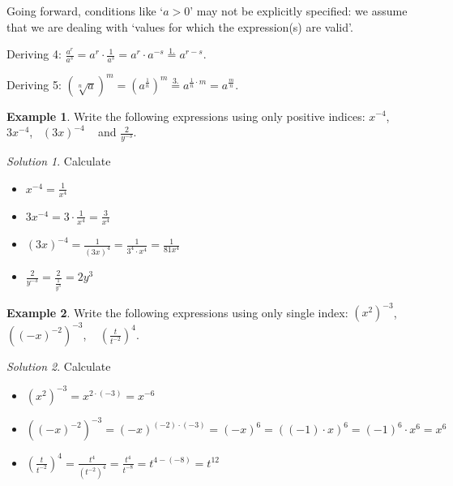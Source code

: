 \documentclass[
  english,
  12pt,
  oneside]{book}
\providecommand{\tightlist}{%
  \setlength{\itemsep}{0pt}\setlength{\parskip}{0pt}}
\theoremstyle{definition}
\theoremstyle{definition}
\newtheorem{example}{Example}[chapter]
\theoremstyle{definition}
\theoremstyle{definition}
\theoremstyle{remark}
\newtheorem*{solution}{Solution}
\begin{document}
Going forward, conditions like `\(a>0\)' may not be explicitly specified: we assume that we are dealing with `values for which the expression(s) are valid'.

Deriving 4: \(\frac{a^r}{a^s} = a^r\cdot \frac{1}{a^s} = a^r\cdot a^{-s} \stackrel{1.}{=} a^{r-s}\).

Deriving 5: \(\left(\sqrt[n]{a}\right)^m = \left(a^{\frac{1}{n}}\right)^m \stackrel{3.}{=} a^{\frac{1}{n}\cdot m} = a^\frac{m}{n}\).

\begin{example}
Write the following expressions using only positive indices: \(x^{-4}\),~ \(3x^{-4}\),~ \((3x)^{-4}\) ~ and \(\frac{2}{y^{-3}}\).
\end{example}

\begin{solution}

Calculate

\begin{itemize}
\tightlist
\item
  \(x^{-4}=\frac{1}{x^4}\)
\item
  \(3x^{-4}=3\cdot\frac{1}{x^4}=\frac{3}{x^4}\)
\item
  \((3x)^{-4} = \frac{1}{(3x)^4} = \frac{1}{3^4\cdot x^4}=\frac{1}{81x^4}\)
\item
  \(\frac{2}{y^{-3}}=\frac{2}{\frac{1}{y^3}}=2y^3\)
\end{itemize}

\end{solution}

\begin{example}
Write the following expressions using only single index: \(\left(x^2\right)^{-3}\), ~ \(\left((-x)^{-2}\right)^{-3}\), ~ \(\left(\frac{t}{t^{-2}}\right)^{4}\).
\end{example}

\begin{solution}

Calculate

\begin{itemize}
\tightlist
\item
  \(\left(x^2\right)^{-3} = x^{2\cdot(-3)}=x^{-6}\)
\item
  \(\left((-x)^{-2}\right)^{-3} = (-x)^{(-2)\cdot(-3)}=(-x)^{6}=\left((-1)\cdot x\right)^6=(-1)^6\cdot x^6=x^6\)
\item
  \(\left(\frac{t}{t^{-2}}\right)^{4}=\frac{t^4}{(t^{-2})^4}=\frac{t^4}{t^{-8}}=t^{4-(-8)}=t^{12}\)
\end{itemize}

\end{solution}
\end{document}
